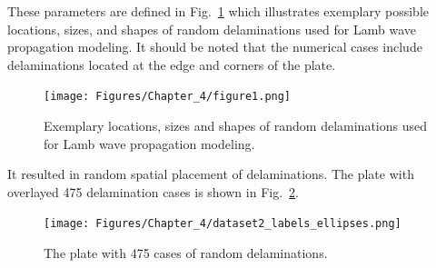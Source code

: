 These parameters are defined in Fig.~\ref{fig:random_delaminations} which illustrates exemplary possible locations, sizes, and shapes of random delaminations used for Lamb wave propagation modeling.
It should be noted that the numerical cases include delaminations located at the edge and corners of the plate.
\begin{figure}[!h]
	\centering
	\texttt{[image: Figures/Chapter\_4/figure1.png]}
	\caption{Exemplary locations, sizes and shapes of random delaminations used for Lamb wave propagation modeling.}
	\label{fig:random_delaminations}
\end{figure}

It resulted in random spatial placement of delaminations. The plate with overlayed 475 delamination cases is shown in Fig.~\ref{fig:random_delam}.
\begin{figure}
	\centering
	\texttt{[image: Figures/Chapter\_4/dataset2\_labels\_ellipses.png]}
	\caption{The plate with 475 cases of random delaminations.}
	\label{fig:random_delam}
\end{figure}

